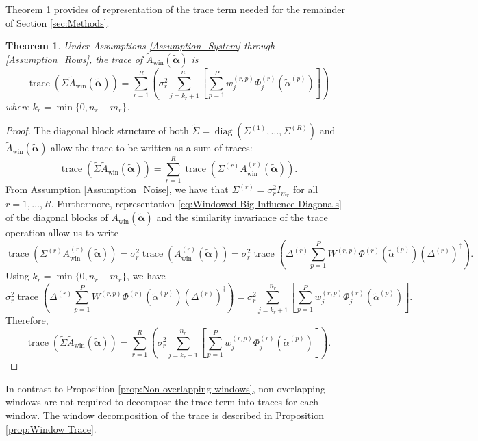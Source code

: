 \documentclass[12pt]{article}
\newcommand{\pinv}[1]{{#1}^\dagger}	%
\DeclareMathOperator{\trace}{trace}		%
\DeclareMathOperator{\diag}{diag}	%
\newcommand{\regparam}{\alpha}  %
\newcommand{\regparamVec}{\bm{\regparam}}   %
\newcommand{\regparamBig}{\widetilde{\regparam}}   %
\newcommand{\regparamVecBig}{\widetilde{\regparamVec}}   %
\newcommand{\AWin}{A_{\text{win}}}	%
\newcommand{\AWinBig}{\widetilde{A}_{\text{win}}}	%
\newcommand{\noiseSD}{\sigma}	%
\newtheorem{theorem}{Theorem}[section]
\begin{document}
Theorem \ref{thm:Trace} provides of representation of the trace term needed for the remainder of Section \ref{sec:Methods}.

\begin{theorem}
\label{thm:Trace}
Under Assumptions \ref{Assumption_System} through \ref{Assumption_Rows}, the trace of $\AWinBig(\regparamVecBig)$ is
\[\trace\left(\widetilde{\Sigma}\AWinBig(\regparamVecBig)\right) = \sum_{r=1}^{R} \left( \noiseSD_r^2 \sum_{j = k_r + 1}^{n_r} \left[\sum_{p=1}^{P} w_j^{(r,p)} \Phi_j^{(r)}\left(\regparamBig^{(p)}\right)\right] \right)\]
where $k_r = \min\{0,n_r - m_r\}$.
\end{theorem}
\begin{proof}
The diagonal block structure of both $\widetilde{\Sigma} = \diag\left(\Sigma^{(1)},\ldots,\Sigma^{(R)}\right)$ and $\AWinBig(\regparamVecBig)$ allow the trace to be written as a sum of traces:
\[\trace\left(\widetilde{\Sigma}\AWinBig(\regparamVecBig)\right) = \sum_{r=1}^{R} \trace\left(\Sigma^{(r)}\AWin^{(r)}\left(\regparamVecBig\right)\right).\]
From Assumption \ref{Assumption_Noise}, we have that $\Sigma^{(r)} = \noiseSD_r^2 I_{m_r}$ for all $r = 1,\ldots,R$. Furthermore, representation \eqref{eq:Windowed Big Influence Diagonals} of the diagonal blocks of $\AWinBig(\regparamVecBig)$ and the similarity invariance of the trace operation allow us to write
\[\trace\left(\Sigma^{(r)}\AWin^{(r)}\left(\regparamVecBig\right)\right) = \noiseSD_r^2 \trace\left(\AWin^{(r)}\left(\regparamVecBig\right)\right) = \noiseSD_r^2 \trace\left(\Delta^{(r)}\sum_{p=1}^{P}W^{(r,p)}\Phi^{(r)}\left(\regparamBig^{(p)}\right)\pinv{\left(\Delta^{(r)}\right)}\right).\]
Using $k_r = \min\{0,n_r - m_r\}$, we have
\[\noiseSD_r^2 \trace\left(\Delta^{(r)}\sum_{p=1}^{P}W^{(r,p)}\Phi^{(r)}\left(\regparamBig^{(p)}\right)\pinv{\left(\Delta^{(r)}\right)}\right) = \noiseSD_r^2 \sum_{j = k_r + 1}^{n_r} \left[\sum_{p=1}^{P} w_j^{(r,p)} \Phi_j^{(r)}\left(\regparamBig^{(p)}\right)\right].\]
Therefore,
\[\trace\left(\widetilde{\Sigma}\AWinBig(\regparamVecBig)\right) = \sum_{r=1}^{R} \left( \noiseSD_r^2 \sum_{j = k_r + 1}^{n_r} \left[\sum_{p=1}^{P} w_j^{(r,p)} \Phi_j^{(r)}\left(\regparamBig^{(p)}\right)\right] \right).\]
\end{proof}

In contrast to Proposition \ref{prop:Non-overlapping windows}, non-overlapping windows are not required to decompose the trace term into traces for each window. The window decomposition of the trace is described in Proposition \ref{prop:Window Trace}.
\end{document}
